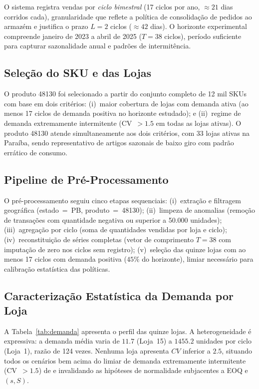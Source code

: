 \documentclass[a4paper,11pt]{article}
\begin{document}
O sistema registra vendas por \emph{ciclo bimestral} (17 ciclos por
ano, $\approx 21$ dias corridos cada), granularidade que reflete a
política de consolidação de pedidos ao armazém e justifica o prazo
$L = 2$ ciclos ($\approx 42$ dias). O horizonte experimental
compreende janeiro de 2023 a abril de 2025 ($T = 38$ ciclos),
período suficiente para capturar sazonalidade anual e padrões de
intermitência.

\subsection{Seleção do SKU e das Lojas}

O produto 48130 foi selecionado a partir do conjunto completo de
12 mil SKUs com base em dois critérios: (i)~maior cobertura de
lojas com demanda ativa (ao menos 17 ciclos de demanda positiva no
horizonte estudado); e (ii)~regime de demanda extremamente
intermitente (CV~$>1.5$ em todas as lojas ativas). O produto 48130
atende simultaneamente aos dois critérios, com 33 lojas ativas na
Paraíba, sendo representativo de artigos sazonais de baixo giro
com padrão errático de consumo.

\subsection{Pipeline de Pré-Processamento}

O pré-processamento seguiu cinco etapas sequenciais:
(i)~extração e filtragem geográfica (estado~=~PB, produto~=~48130);
(ii)~limpeza de anomalias (remoção de transações com quantidade
negativa ou superior a 50.000 unidades);
(iii)~agregação por ciclo (soma de quantidades vendidas por loja e
ciclo);
(iv)~reconstituição de séries completas (vetor de comprimento
$T = 38$ com imputação de zero nos ciclos sem registro);
(v)~seleção das quinze lojas com ao menos 17 ciclos com demanda
positiva ($45\%$ do horizonte), limiar necessário para
calibração estatística das políticas.

\subsection{Caracterização Estatística da Demanda por Loja}

A Tabela~\ref{tab:demanda} apresenta o perfil das quinze lojas.
A heterogeneidade é expressiva: a demanda média varia de $11.7$
(Loja~15) a $1455.2$ unidades por ciclo (Loja~1), razão de 124
vezes. Nenhuma loja apresenta $CV$ inferior a $2.5$, situando todos
os cenários bem acima do limiar de demanda extremamente intermitente
(CV~$>1.5$) de \citet{syntetos:2001} e invalidando as hipóteses de
normalidade subjacentes a EOQ e~$(s,S)$.
\end{document}
